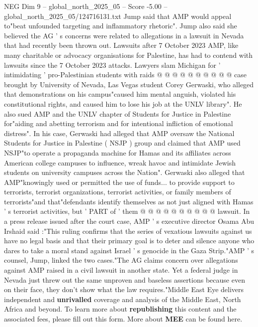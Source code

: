 \begin{textsample}{NEG Dim 9 – global\_north\_2025\_05 – Score -5.00 – global\_north\_2025\_05/124716131.txt}
Jump said that AMP would appeal to"beat unfounded targeting and inflammatory rhetoric".
Jump also said she believed the AG ' s concerns were related to allegations in a lawsuit in Nevada that had recently been thrown out.
Lawsuits after 7 October 2023 AMP, like many charitable or advocacy organisations for Palestine, has had to contend with lawsuits since the 7 October 2023 attacks.
Lawyers slam Michigan for ' intimidating ' pro-Palestinian students with raids @ @ @ @ @ @ @ @ @ @ case brought by University of Nevada, Las Vegas student Corey Gerwaski, who alleged that demonstrations on his campus"caused him mental anguish, violated his constitutional rights, and caused him to lose his job at the UNLV library".
He also sued AMP and the UNLV chapter of Students for Justice in Palestine for"aiding and abetting terrorism and for intentional infliction of emotional distress".
In his case, Gerwaski had alleged that AMP oversaw the National Students for Justice in Palestine ( NSJP ) group and claimed that AMP used NSJP"to operate a propaganda machine for Hamas and its affiliates across American college campuses to influence, wreak havoc and intimidate Jewish students on university campuses across the Nation".
Gerwaski also alleged that AMP"knowingly used or permitted the use of funds... to provide support to terrorists, terrorist organizations, terrorist activities, or family members of terrorists"and that"defendants identify themselves as not just aligned with Hamas ' s terrorist activities, but ' PART of ' them @ @ @ @ @ @ @ @ @ @ lawsuit.
In a press release issued after the court case, AMP ' s executive director Osama Abu Irshaid said :"This ruling confirms that the series of vexatious lawsuits against us have no legal basis and that their primary goal is to deter and silence anyone who dares to take a moral stand against Israel ' s genocide in the Gaza Strip."AMP ' s counsel, Jump, linked the two cases."The AG claims concern over allegations against AMP raised in a civil lawsuit in another state.
Yet a federal judge in Nevada just threw out the same unproven and baseless assertions because even on their face, they don't show what the law requires."Middle East Eye delivers independent and \textbf{unrivalled} coverage and analysis of the Middle East, North Africa and beyond.
To learn more about \textbf{republishing} this content and the associated fees, please fill out this form.
More about \textbf{MEE} can be found here.

\end{textsample}
